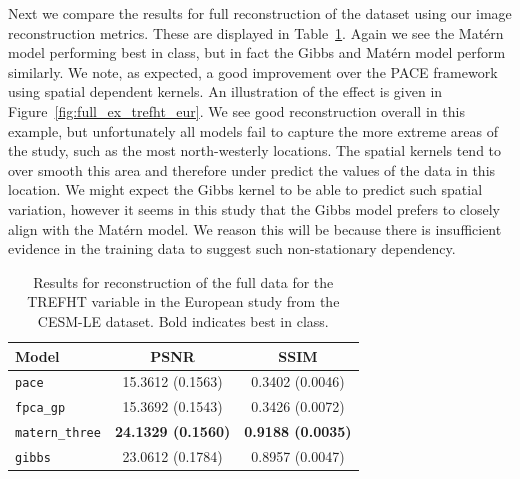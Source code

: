 Next we compare the results for full reconstruction of the dataset using our image reconstruction metrics.
These are displayed in Table~\ref{tab:full_cesm_trefht_eur}.
Again we see the Mat\'ern model performing best in class, but in fact the Gibbs and Mat\'ern model perform similarly.
We note, as expected, a good improvement over the PACE framework using spatial dependent kernels.
An illustration of the effect is given in Figure~\ref{fig:full_ex_trefht_eur}.
We see good reconstruction overall in this example, but unfortunately all models fail to capture the more extreme areas of the study, such as the most north-westerly locations.
The spatial kernels tend to over smooth this area and therefore under predict the values of the data in this location.
We might expect the Gibbs kernel to be able to predict such spatial variation, however it seems in this study that the Gibbs model prefers to closely align with the Mat\'ern model.
We reason this will be because there is insufficient evidence in the training data to suggest such non-stationary dependency. 

\begin{table}
	\caption[Results for the TREFHT variable on full data in the European study.]{Results for reconstruction of the full data for the TREFHT variable in the European study from the CESM-LE dataset. Bold indicates best in class.}
	\centering
	\label{tab:full_cesm_trefht_eur}
	\begin{tabular}{lcc}
		\toprule
		\textbf{Model} & \textbf{PSNR} & \textbf{SSIM} \\
		\midrule
		\verb*|pace| & 15.3612	(0.1563)& 0.3402 (0.0046) \\
		\verb*|fpca_gp| & 15.3692 (0.1543)& 0.3426	(0.0072) \\
		\verb*|matern_three| & \textbf{24.1329	(0.1560)}& \textbf{0.9188 (0.0035)}\\
		\verb*|gibbs| & 23.0612	(0.1784) & 0.8957 (0.0047)\\
		\bottomrule
	\end{tabular}
\end{table}

